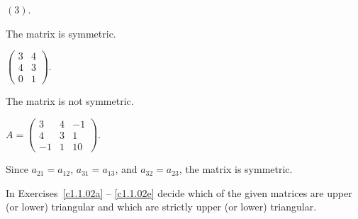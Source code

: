 \documentclass{ximera}
\begin{document}
\begin{exercise} \label{c1.1.01c}
  $(3)$.
  \begin{multipleChoice}
  \end{multipleChoice}  

\begin{solution}
The matrix is symmetric.

\end{solution}
\end{exercise}

\begin{exercise} \label{c1.1.01d}
  $\left( \begin{array}{rr}
            3 & 4 \\
            4 & 3 \\
            0 & 1 \end{array} \right)$.
  \begin{multipleChoice}
  \end{multipleChoice}          

\begin{solution}
The matrix is not symmetric.

\end{solution}
\end{exercise}

\begin{exercise} \label{c1.1.01e}
 $A = \left( \begin{array}{rrr}
 3 & 4 & -1\\
 4 & 3 &  1\\
 -1 & 1 & 10\end{array} \right)$.
  \begin{multipleChoice}
  \end{multipleChoice}
       

\begin{solution}
Since $a_{21} = a_{12}$, $a_{31} = a_{13}$, and $a_{32} = a_{23}$, the matrix is symmetric.

\end{solution}
\end{exercise}

\noindent In Exercises~\ref{c1.1.02a} -- \ref{c1.1.02e} decide which
of the given matrices are upper (or lower) triangular and which are
strictly upper (or lower) triangular.
\end{document}
